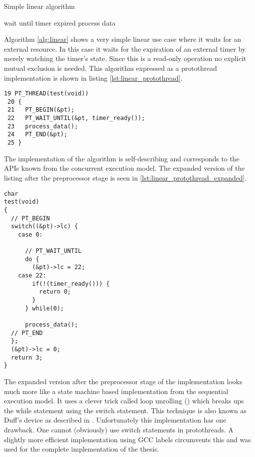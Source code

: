 \begin{algorithm}[H]
\caption{Simple linear algorithm}
\label{alg:linear}
\begin{algorithmic}
    \STATE wait until timer expired
    \STATE process data
\ENDWHILE
\end{algorithmic}
\end{algorithm}

Algorithm \ref{alg:linear} shows a very simple linear use case where it waits for an external resource. In this case it waits for the expiration of an external timer by merely watching the timer's state. Since this is a read-only operation no explicit mutual exclusion is needed. This algorithm expressed as a protothread implementation is shown in listing \ref{lst:linear_protothread}.

\begin{lstlisting}[label=lst:linear_protothread,caption=linear protothread implementation]
 19 PT_THREAD(test(void))
 20 {
 21   PT_BEGIN(&pt);
 22   PT_WAIT_UNTIL(&pt, timer_ready());
 23   process_data();
 24   PT_END(&pt);
 25 }
\end{lstlisting}

The implementation of the algorithm is self-describing and corresponds to the APIs known from the concurrent execution model. The expanded version of the listing after the preprocessor stage is seen in \ref{lst:linear_protothread_expanded}.

\begin{lstlisting}[label=lst:linear_protothread_expanded,caption=expanded linear protothread implementation]
char
test(void)
{
  // PT_BEGIN
  switch((&pt)->lc) {
    case 0:

      // PT_WAIT_UNTIL
      do {
        (&pt)->lc = 22;
    case 22:
        if(!(timer_ready())) {
          return 0;
        }
      } while(0);

      process_data();
  // PT_END
  };
  (&pt)->lc = 0;
  return 3;
}
\end{lstlisting}

The expanded version after the preprocessor stage of the implementation looks much more like a state machine based implementation from the sequential execution model. It uses a clever trick called loop unrolling (\cite{abrash}) which breaks ups the while statement using the switch statement. This technique is also known as Duff's device as described in \cite{duff}. Unfortunately this implementation has one drawback. One cannot (obviously) use switch statements in protothreads. A slightly more efficient implementation using GCC labels circumvents this and was used for the complete implementation of the thesis.

